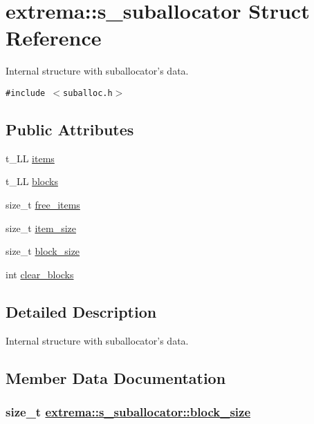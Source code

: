 \hypertarget{structextrema_1_1s__suballocator}{
\section{extrema::s\_\-suballocator Struct Reference}
\label{structextrema_1_1s__suballocator}
}
Internal structure with suballocator's data.  


{\tt \#include $<$suballoc.h$>$}

\subsection*{Public Attributes}
\begin{CompactItemize}
\item 
t\_\-LL \hyperlink{structextrema_1_1s__suballocator_70ebd18b96ccee641329c9276a91072d}{items}
\item 
t\_\-LL \hyperlink{structextrema_1_1s__suballocator_c9fa93202098c4089fe15c123bed91f9}{blocks}
\item 
size\_\-t \hyperlink{structextrema_1_1s__suballocator_65bc7201a90aaed4f3e1504322381027}{free\_\-items}
\item 
size\_\-t \hyperlink{structextrema_1_1s__suballocator_e52543e1a5b473eee46a8fc3ba7a0e18}{item\_\-size}
\item 
size\_\-t \hyperlink{structextrema_1_1s__suballocator_6c2dcea521802e7ebc4a4ccdc0b23427}{block\_\-size}
\item 
int \hyperlink{structextrema_1_1s__suballocator_5ed758d9ddbf579f7c2c399c1ccf4ab4}{clear\_\-blocks}
\end{CompactItemize}


\subsection{Detailed Description}
Internal structure with suballocator's data. 



\subsection{Member Data Documentation}
\hypertarget{structextrema_1_1s__suballocator_6c2dcea521802e7ebc4a4ccdc0b23427}{
\subsubsection[block\_\-size]{\setlength{\rightskip}{0pt plus 5cm}size\_\-t \hyperlink{structextrema_1_1s__suballocator_6c2dcea521802e7ebc4a4ccdc0b23427}{extrema::s\_\-suballocator::block\_\-size}}}
\label{structextrema_1_1s__suballocator_6c2dcea521802e7ebc4a4ccdc0b23427}


